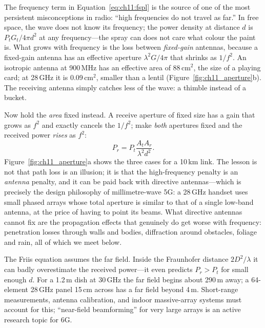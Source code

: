 The frequency term in Equation~\eqref{eq:ch11:fspl} is the source of one of the most
persistent misconceptions in radio: ``high frequencies do not travel as far.'' In free space,
the wave does not know its frequency; the power density at distance $d$ is $P_tG_t/4\pi d^2$
at any frequency---the spray can does not care what colour the paint is. What grows with
frequency is the loss between \emph{fixed-gain} antennas, because a fixed-gain antenna has an
effective aperture $\lambda^2G/4\pi$ that shrinks as $1/f^2$. An isotropic antenna at 900\,MHz
has an effective area of 88\,cm$^2$, the size of a playing card; at 28\,GHz it is 0.09\,cm$^2$,
smaller than a lentil (Figure~\ref{fig:ch11_aperture}b). The receiving antenna simply catches
less of the wave: a thimble instead of a bucket.

Now hold the \emph{area} fixed instead. A receive aperture of fixed size has a gain that grows
as $f^2$ and exactly cancels the $1/f^2$; make \emph{both} apertures fixed and the received power
\emph{rises} as $f^2$:
\begin{equation}
P_r=P_t\frac{A_tA_r}{\lambda^2d^2}.
\end{equation}
Figure~\ref{fig:ch11_aperture}a shows the three cases for a 10\,km link. The lesson is not that
path loss is an illusion; it is that the high-frequency penalty is an \emph{antenna} penalty,
and it can be paid back with directive antennas---which is precisely the design philosophy of
millimetre-wave 5G: a 28\,GHz handset uses small phased arrays whose total aperture is similar
to that of a single low-band antenna, at the price of having to point its beams. What directive
antennas cannot fix are the propagation effects that genuinely do get worse with frequency:
penetration losses through walls and bodies, diffraction around obstacles, foliage and rain,
all of which we meet below.


\begin{pitfall}
The Friis equation assumes the far field. Inside the Fraunhofer distance $2D^2/\lambda$ it can
badly overestimate the received power---it even predicts $P_r>P_t$ for small enough $d$. For a
1.2\,m dish at 30\,GHz the far field begins about 290\,m away; a 64-element 28\,GHz panel 15\,cm
across has a far field beyond 4\,m. Short-range measurements, antenna calibration, and indoor
massive-array systems must account for this; ``near-field beamforming'' for very large arrays is
an active research topic for 6G.
\end{pitfall}

